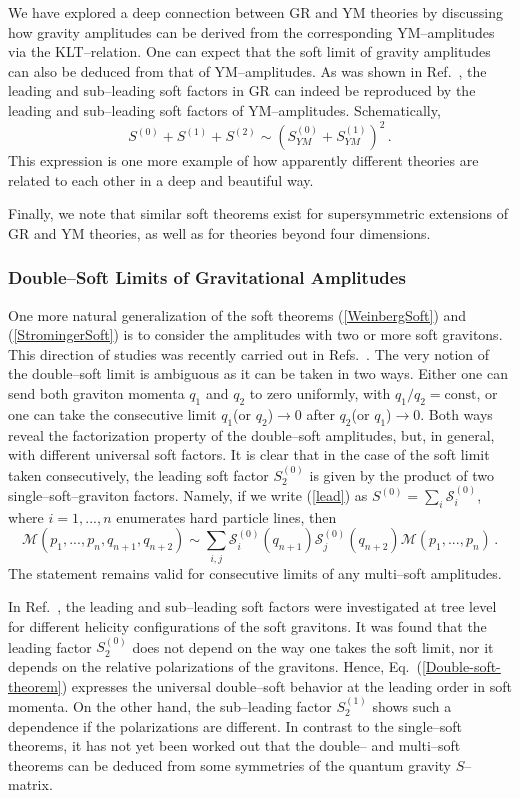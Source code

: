 \documentclass[11pt,a4paper]{article}
\newcommand{\be}{\begin{equation}}
\newcommand{\ee}{\end{equation}}
\newcommand{\M}{\mathcal{M}}
\begin{document}
We have explored a deep connection between GR and YM theories
by discussing how gravity amplitudes can be derived from the corresponding YM--amplitudes via the KLT--relation.
One can expect that the soft limit of gravity amplitudes can also be deduced from that of YM--amplitudes.
As was shown in Ref.~\cite{Du:2014eca}, the leading and sub--leading soft factors in GR can
indeed be reproduced by the leading and sub--leading soft factors of YM--amplitudes.
Schematically,
\be
S^{(0)}+S^{(1)}+S^{(2)}\sim \left(S^{(0)}_{YM}+S^{(1)}_{YM}\right)^2\,.
\ee
This expression is one more example of how apparently different theories are related to each other in a deep and beautiful way.

Finally, we note that similar soft theorems exist for supersymmetric extensions of GR and YM theories, as well as for theories beyond four dimensions.

\subsubsection{Double--Soft Limits of Gravitational Amplitudes}

One more natural generalization of the soft theorems (\ref{WeinbergSoft}) and (\ref{StromingerSoft}) is to consider the amplitudes with two or more soft gravitons. This direction of studies was recently carried out in Refs.~\cite{Klose:2015xoa,Volovich:2015yoa}. The very notion of the double--soft limit is ambiguous as it can be taken in two ways. Either one can send both graviton momenta $q_1$ and $q_2$ to zero uniformly, with $q_1/q_2=\text{const}$, or one can take the consecutive limit $q_1$(or $q_2$)$\rightarrow 0$ after $q_2$(or $q_1$)$\rightarrow 0$. Both ways reveal the factorization property of the double--soft amplitudes, but, in general, with different universal soft factors. It is clear that in the case of the soft limit taken consecutively, the leading soft factor $S^{(0)}_2$ is given by the product of two single--soft--graviton factors. Namely, if we write (\ref{lead}) as $S^{(0)}=\sum_i \mathcal{S}^{(0)}_i$, where $i=1,...,n$ enumerates hard particle lines, then
\be \label{Double-soft-theorem}
\M(p_1,...,p_n,q_{n+1},q_{n+2})\sim\sum_{i,j}\mathcal{S}^{(0)}_i(q_{n+1})\mathcal{S}^{(0)}_j(q_{n+2})\M(p_1,...,p_n)\,.
\ee
The statement remains valid for consecutive limits of any multi--soft amplitudes.

In Ref.~\cite{Klose:2015xoa}, the leading and sub--leading soft factors were investigated at tree level for different helicity configurations of the soft gravitons.
It was found that the leading factor $S^{(0)}_2$ does not depend on the way one takes the soft limit, nor it depends
on the relative polarizations of the gravitons.
Hence, Eq.~(\ref{Double-soft-theorem}) expresses the universal double--soft behavior at the leading order in soft momenta. On the other hand, the sub--leading factor $S^{(1)}_2$ shows such a dependence if the polarizations are different.
In contrast to the single--soft theorems,
it has not yet been worked out that the double-- and multi--soft theorems
can be deduced from some symmetries of the quantum gravity $S$--matrix.
\end{document}
